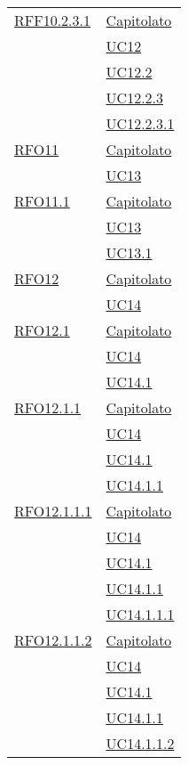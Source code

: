 \begin{longtable}{|>{\centering}m{5cm}|m{5cm}<{\centering}|}
 \hyperlink{RFF10.2.3.1}{RFF10.2.3.1} & \hyperlink{Capitolato}{Capitolato}\\
& \hyperref[UC12]{UC12}\\
& \hyperref[UC12.2]{UC12.2}\\
& \hyperref[UC12.2.3]{UC12.2.3}\\
& \hyperref[UC12.2.3.1]{UC12.2.3.1}\\\hline

 \hyperlink{RFO11}{RFO11} & \hyperlink{Capitolato}{Capitolato}\\
& \hyperref[UC13]{UC13}\\\hline

\hyperlink{RFO11.1}{RFO11.1} & \hyperlink{Capitolato}{Capitolato}\\
& \hyperref[UC13]{UC13}\\
& \hyperref[UC13.1]{UC13.1}\\\hline

 \hyperlink{RFO12}{RFO12} & \hyperlink{Capitolato}{Capitolato}\\
& \hyperref[UC14]{UC14}\\\hline

 \hyperlink{RFO12.1}{RFO12.1} & \hyperlink{Capitolato}{Capitolato}\\
& \hyperref[UC14]{UC14}\\
& \hyperref[UC14.1]{UC14.1}\\\hline

 \hyperlink{RFO12.1.1}{RFO12.1.1} & \hyperlink{Capitolato}{Capitolato}\\
& \hyperref[UC14]{UC14}\\
& \hyperref[UC14.1]{UC14.1}\\
& \hyperref[UC14.1.1]{UC14.1.1}\\\hline

 \hyperlink{RFO12.1.1.1}{RFO12.1.1.1} & \hyperlink{Capitolato}{Capitolato}\\
& \hyperref[UC14]{UC14}\\
& \hyperref[UC14.1]{UC14.1}\\
& \hyperref[UC14.1.1]{UC14.1.1}\\
& \hyperref[UC14.1.1.1]{UC14.1.1.1}\\\hline

 \hyperlink{RFO12.1.1.2}{RFO12.1.1.2} & \hyperlink{Capitolato}{Capitolato}\\
& \hyperref[UC14]{UC14}\\
& \hyperref[UC14.1]{UC14.1}\\
& \hyperref[UC14.1.1]{UC14.1.1}\\
& \hyperref[UC14.1.1.2]{UC14.1.1.2}\\\hline


\end{longtable}
